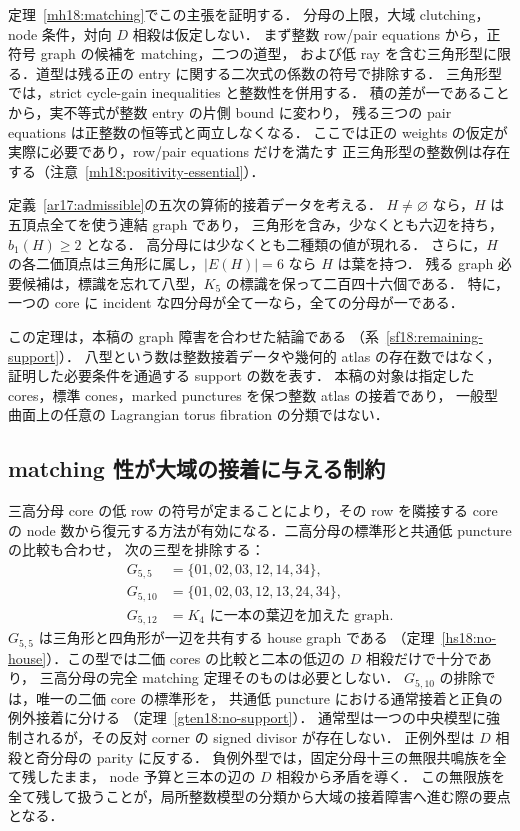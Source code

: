 定理~\ref{mh18:matching}でこの主張を証明する．
分母の上限，大域 clutching，node 条件，対向 $D$ 相殺は仮定しない．
まず整数 row/pair equations から，正符号 graph の候補を matching，二つの道型，
および低 ray を含む三角形型に限る．道型は残る正の entry に関する二次式の係数の符号で排除する．
三角形型では，strict cycle-gain inequalities と整数性を併用する．
積の差が一であることから，実不等式が整数 entry の片側 bound に変わり，
残る三つの pair equations は正整数の恒等式と両立しなくなる．
ここでは正の weights の仮定が実際に必要であり，row/pair equations だけを満たす
正三角形型の整数例は存在する（注意~\ref{mh18:positivity-essential}）．

\begin{theorem}
\label{ar17:main-support}
定義~\ref{ar17:admissible}の五次の算術的接着データを考える．
$H\ne\varnothing$ なら，$H$ は五頂点全てを使う連結 graph であり，
三角形を含み，少なくとも六辺を持ち，$b_1(H)\ge2$ となる．
高分母には少なくとも二種類の値が現れる．
さらに，$H$ の各二価頂点は三角形に属し，$|E(H)|=6$ なら $H$ は葉を持つ．
残る graph 必要候補は，標識を忘れて八型，$K_5$ の標識を保って二百四十六個である．
特に，一つの core に incident な四分母が全て一なら，全ての分母が一である．
\end{theorem}

この定理は，本稿の graph 障害を合わせた結論である
（系~\ref{sf18:remaining-support}）．
八型という数は整数接着データや幾何的 atlas の存在数ではなく，
証明した必要条件を通過する support の数を表す．
本稿の対象は指定した cores，標準 cones，marked punctures を保つ整数 atlas の接着であり，
一般型曲面上の任意の Lagrangian torus fibration の分類ではない．

\subsection{matching 性が大域の接着に与える制約}

三高分母 core の低 row の符号が定まることにより，その row を隣接する core の
node 数から復元する方法が有効になる．二高分母の標準形と共通低 puncture の比較も合わせ，
次の三型を排除する：
\[
 \begin{split}
 G_{5,5}&=\{01,02,03,12,14,34\},\\
 G_{5,10}&=\{01,02,03,12,13,24,34\},\\
 G_{5,12}&=K_4\text{ に一本の葉辺を加えた graph}.
 \end{split}
\]
$G_{5,5}$ は三角形と四角形が一辺を共有する house graph である
（定理~\ref{hs18:no-house}）．この型では二価 cores の比較と二本の低辺の $D$ 相殺だけで十分であり，
三高分母の完全 matching 定理そのものは必要としない．
$G_{5,10}$ の排除では，唯一の二価 core の標準形を，
共通低 puncture における通常接着と正負の例外接着に分ける
（定理~\ref{gten18:no-support}）．
通常型は一つの中央模型に強制されるが，その反対 corner の signed divisor が存在しない．
正例外型は $D$ 相殺と奇分母の parity に反する．
負例外型では，固定分母十三の無限共鳴族を全て残したまま，
node 予算と三本の辺の $D$ 相殺から矛盾を導く．
この無限族を全て残して扱うことが，局所整数模型の分類から大域の接着障害へ進む際の要点となる．

